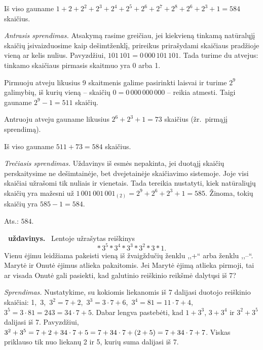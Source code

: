 \documentclass[11pt,a4paper]{article}
\newcommand{\hm}[1]{\nobreak\hspace{0pt}#1\nobreak\hspace{0pt}}
\newcounter{uzdavinys}
\newenvironment{uzdavinys}
  {\refstepcounter{uzdavinys}\par\medskip\noindent\textbf{\theuzdavinys\ uždavinys.}\ }
  {\par\medskip}
\begin{document}
Iš viso gauname $1+2+2^2+2^3+2^4+2^5+2^6+2^7+2^8+2^6+2^3+1=584$ skaičius.

 \vspace{0,3cm}

\textit{Antrasis sprendimas.} Atsakymą rasime greičiau, jei kiekvieną tinkamą natūralųjį skaičių įsivaizduosime kaip dešimtženklį, prireikus prirašydami skaičiaus pradžioje vieną ar kelis nulius. Pavyzdžiui, $101\,101=0\,000\,101\,101$. Tada turime du atvejus: tinkamo skaičiaus pirmasis skaitmuo yra 0 arba 1.

Pirmuoju atveju likusius 9 skaitmenis galime pasirinkti laisvai ir turime $2^9$ galimybių, iš kurių vieną -- skaičių $0=0\,000\,000\,000$ -- reikia atmesti. Taigi gauname $2^9-1=511$ skaičių.

Antruoju atveju gauname likusius $2^6+2^3+1=73$ skaičius (žr.~pirmąjį sprendimą).

Iš viso gauname $511+73=584$ skaičius.

 \vspace{0,3cm}

\textit{Trečiasis sprendimas.} Uždavinys iš esmės nepakinta, jei duotąjį skaičių perskaitysime ne dešimtainėje, bet dvejetainėje skaičiavimo sistemoje.  Joje visi skaičiai užrašomi tik nuliais ir vienetais. Tada tereikia nustatyti, kiek natūraliųjų skaičių yra mažesni už $1\,001\,001\,001_{(2)}=2^9+2^6+2^3+1=585$. Žinoma, tokių skaičių yra $585-1=584$.

\begin{flushright}
     Ats.: $584$.
\end{flushright}
 \vspace{0,3cm}  

\begin{uzdavinys} 
Lentoje užrašytas reiškinys
$$*\,3^5*3^4*3^3*3^2*3*1.$$
Vienu ėjimu leidžiama pakeisti vieną iš žvaigždučių ženklu ,,+`` arba ženklu ,,–``. Marytė ir Onutė ėjimus atlieka pakaitomis. Jei Marytė ėjimą atlieka pirmoji, tai ar visada Onutė gali pasiekti, kad galutinio reiškinio reikšmė dalytųsi iš 7?
\end{uzdavinys}

\textit{Sprendimas.} Nustatykime, su kokiomis liekanomis iš 7 dalijasi duotojo reiškinio skaičiai: 1, \,3, \,$3^2=7+2$, \,$3^3=3\cdot7+6$, \,$3^4=81=11\cdot7+4$, \,$3^5=3\cdot81=243=34\cdot7+5$.
Dabar lengva pastebėti, kad $1+3^3$, $3+3^4$ ir $3^2+3^5$ dalijasi iš 7. Pavyzdžiui, $3^2+3^5\hm=7+2+34\cdot7+5=7+34\cdot7+(2+5)=7+34\cdot7+7$.
Viskas priklauso tik nuo liekanų 2 ir 5, kurių suma dalijasi iš 7.
\end{document}
